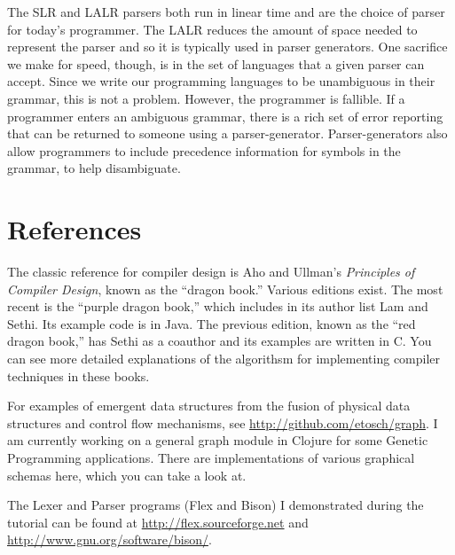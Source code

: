 \documentclass[a4paper, 10pt]{article}
\begin{document}
The SLR and LALR parsers both run in linear time and are the choice of parser for today's programmer. The LALR reduces the amount of space needed to represent the parser and so it is typically used in parser generators. One sacrifice we make for speed, though, is in the set of languages that a given parser can accept. Since we write our programming languages to be unambiguous in their grammar, this is not a problem. However, the programmer is fallible. If a programmer enters an ambiguous grammar, there is a rich set of error reporting that can be returned to someone using a parser-generator. Parser-generators also allow programmers to include precedence information for symbols in the grammar, to help disambiguate.


\section{References}
The classic reference for compiler design is Aho and Ullman's \emph{Principles of Compiler Design}, known as the ``dragon book.'' Various editions exist. The most recent is the ``purple dragon book,'' which includes in its author list Lam and Sethi. Its example code is in Java. The previous edition, known as the ``red dragon book,'' has Sethi as a coauthor and its examples are written in C. You can see more detailed explanations of the algorithsm for implementing compiler techniques in these books.

For examples of emergent data structures from the fusion of physical data structures and control flow mechanisms, see \url{http://github.com/etosch/graph}. I am currently working on a general graph module in Clojure for some Genetic Programming applications. There are implementations of various graphical schemas here, which you can take a look at.

The Lexer and Parser programs (Flex and Bison) I demonstrated during the tutorial can be found at \url{http://flex.sourceforge.net} and \url{http://www.gnu.org/software/bison/}.
\end{document}
